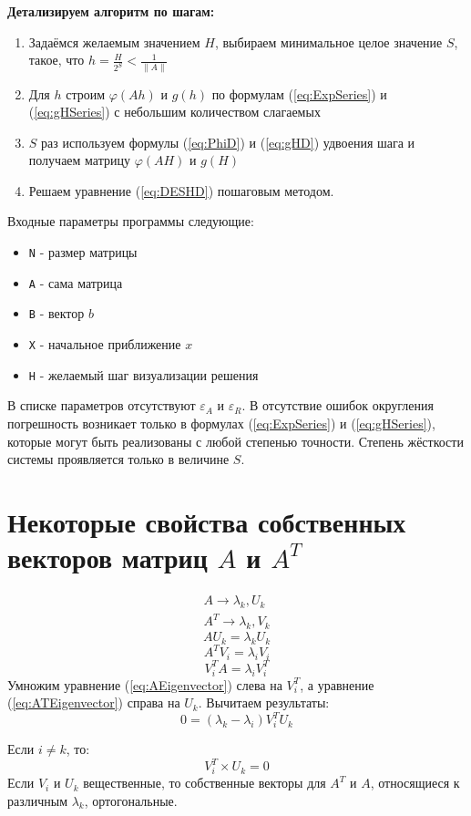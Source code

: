 \documentclass[a4paper,11pt]{article}
\begin{document}
\begin{importantblock}
  \textbf{Детализируем алгоритм по шагам:}
  \begin{enumerate}
    \item Задаёмся желаемым значением $H$, выбираем минимальное целое значение $S$, такое, что $h = \frac{H}{2^S} < \frac{1}{\|A\|}$
    \item Для $h$ строим $\varphi(Ah)$ и $g(h)$ по формулам (\ref{eq:ExpSeries}) и (\ref{eq:gHSeries}) с небольшим количеством слагаемых
    \item $S$ раз используем формулы (\ref{eq:PhiD}) и (\ref{eq:gHD}) удвоения шага и получаем матрицу $\varphi(AH)$ и $g(H)$
    \item Решаем уравнение (\ref{eq:DESHD}) пошаговым методом.
  \end{enumerate}
  Входные параметры программы следующие:
  \begin{itemize}
    \item \verb|N| - размер матрицы
    \item \verb|A| - сама матрица
    \item \verb|B| - вектор $b$
    \item \verb|X| - начальное приближение $x$
    \item \verb|H| - желаемый шаг визуализации решения
  \end{itemize}
  В списке параметров отсутствуют $\varepsilon_A$ и $\varepsilon_R$. В отсутствие ошибок округления погрешность возникает только в
    формулах (\ref{eq:ExpSeries}) и (\ref{eq:gHSeries}), которые могут быть реализованы с любой степенью точности. Степень жёсткости системы проявляется
    только в величине $S$.
\end{importantblock}

\section{Некоторые свойства собственных векторов матриц $A$ и $A^T$}
\setcounter{equation}{0}
\begin{gather*}
  A \rightarrow \lambda_k, U_k \\
  A^T \rightarrow \lambda_k, V_k
\end{gather*}
\begin{equation}
  AU_k = \lambda_kU_k
  \label{eq:AEigenvector}
\end{equation}
\[A^TV_i = \lambda_iV_i\]
\begin{equation}
  V_i^TA = \lambda_iV_i^T
  \label{eq:ATEigenvector}
\end{equation}
Умножим уравнение (\ref{eq:AEigenvector}) слева на $V_i^T$, а уравнение (\ref{eq:ATEigenvector}) справа на $U_k$. Вычитаем результаты:
\[0 = (\lambda_k - \lambda_i)V_i^TU_k\]
\begin{importantblock}
  Если $i \ne k$, то:
  \begin{equation*}
    V_i^T \times U_k = 0 \tag{*!}
    \label{eq:AATRule}
  \end{equation*}
  Если $V_i$ и $U_k$ вещественные, то собственные векторы для $A^T$ и $A$, относящиеся к различным $\lambda_k$, ортогональные.
\end{importantblock}
\end{document}
